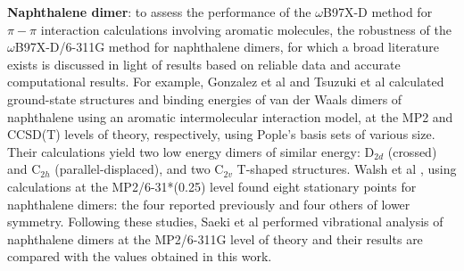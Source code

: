 \textbf{Naphthalene dimer}: to assess the performance of the $\omega$B97X-D method for $\pi -\pi$ interaction calculations involving aromatic molecules, the robustness of the $\omega$B97X-D/6-311G method for naphthalene dimers, for which a broad literature exists \cite{saeki2006theoretical,gonzalez2000quantum,tsuzuki2004high,walsh2002ab,rubevs2008investigation} is discussed in light of results based on reliable data and accurate computational results. For example, Gonzalez et al \cite{gonzalez2000quantum} and Tsuzuki et al \cite{tsuzuki2004high} calculated ground-state structures and binding energies of van der Waals dimers of naphthalene using an aromatic intermolecular interaction model, at the MP2 and CCSD(T) levels of theory, respectively, using Pople’s basis sets of various size. Their calculations yield two low energy dimers of similar energy: D$_{2d}$ (crossed) and C$_{2h}$ (parallel-displaced), and two C$_{2v}$ T-shaped structures. Walsh et al \cite{walsh2002ab,rubevs2008investigation}, using calculations at the MP2/6-31*(0.25) level found eight stationary points for naphthalene dimers: the four reported previously and four others of lower symmetry. Following these studies, Saeki et al \cite{saeki2006theoretical} performed vibrational analysis of naphthalene dimers at the MP2/6-311G level of theory and their results are compared with the values obtained in this work.\\

